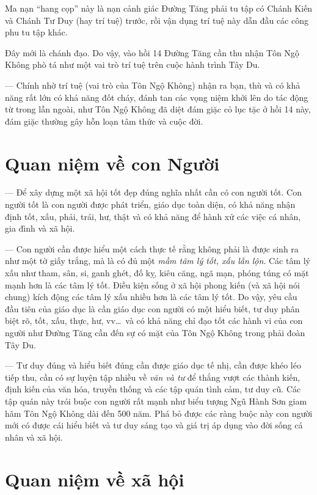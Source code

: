 Ma nạn ``hang cọp'' này là nạn cảnh giác Đường Tăng phải tu tập có Chánh Kiến và Chánh Tư Duy (hay trí tuệ) trước, rồi vận dụng trí tuệ này dẫn đầu các công phu tu tập khác.

Đây mới là chánh đạo. Do vậy, vào hồi 14 Đường Tăng cần thu nhận Tôn Ngộ Không phò tá như một vai trò trí tuệ trên cuộc hành trình Tây Du.

--- Chính nhờ trí tuệ (vai trò của Tôn Ngộ Không) nhận ra bạn, thù và có khả năng rất lớn có khả năng đốt cháy, đánh tan các vọng niệm khởi lên do tác động từ trong lẫn ngoài, như Tôn Ngộ Không đã diệt đám giặc cỏ lục tặc ở hồi 14 này, đám giặc thường gây hỗn loạn tâm thức và cuộc đời.

\section{Quan niệm về con Người} %
\label{sec:13_con_nguoi}

--- Để xây dựng một xã hội tốt đẹp đúng nghĩa nhất cần có con người tốt. Con người tốt là con người được phát triển, giáo dục toàn diện, có khả năng nhận định tốt, xấu, phải, trái, hư, thật và có khả năng để hành xử các việc cá nhân, gia đình và xã hội.

--- Con người cần được hiểu một cách thực tế rằng không phải là được sinh ra như một tờ giấy trắng, mà là có đủ một \emph{mầm tâm lý tốt, xấu lẫn lộn}. Các tâm lý xấu như tham, sân, si, ganh ghét, đố kỵ, kiêu căng, ngã mạn, phóng túng có mặt mạnh hơn là các tâm lý tốt. Điều kiện sống ở xã hội phong kiến (và xã hội nói chung) kích động các tâm lý xấu nhiều hơn là các tâm lý tốt. Do vậy, yêu cầu đầu tiên của giáo dục là cần giáo dục con người có một hiểu biết, tư duy phân biệt rõ, tốt, xấu, thực, hư, vv\ldots ~và có khả năng chỉ đạo tốt các hành vi của con người như Đường Tăng cần đến sự có mặt của Tôn Ngộ Không trong phải đoàn Tây Du.

--- Tư duy đúng và hiểu biết đúng cần được giáo dục tế nhị, cần được khéo léo tiếp thu, cần có sự luyện tập nhiều về \emph{văn và tư} để thắng vượt các thành kiến, định kiến của văn hóa, truyền thống và các tập quán tình cảm, tư duy cũ. Các tập quán này trói buộc con người rất mạnh như biểu tượng Ngũ Hành Sơn giam hãm Tôn Ngộ Không dài đến 500 năm. Phá bỏ được các ràng buộc này con người mới có được cái hiểu biết và tư duy sáng tạo và giá trị áp dụng vào đời sống cá nhân và xã hội.

\section{Quan niệm về xã hội} %
\label{sec:13_xa_hoi}

